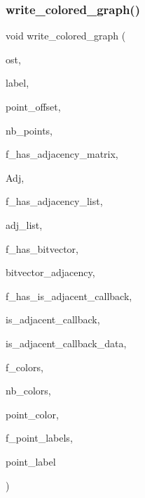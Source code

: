 \subsubsection{\texorpdfstring{write\+\_\+colored\+\_\+graph()}{write\_colored\_graph()}}
{\footnotesize\ttfamily void write\+\_\+colored\+\_\+graph (\begin{DoxyParamCaption}\item[{ofstream \&}]{ost,  }\item[{\mbox{\hyperlink{galois_8h_ab6cc7b4aeb6ea31aba2b3fbfc83ff5e6}{B\+Y\+TE}} $\ast$}]{label,  }\item[{\mbox{\hyperlink{galois_8h_a09fddde158a3a20bd2dcadb609de11dc}{I\+NT}}}]{point\+\_\+offset,  }\item[{\mbox{\hyperlink{galois_8h_a09fddde158a3a20bd2dcadb609de11dc}{I\+NT}}}]{nb\+\_\+points,  }\item[{\mbox{\hyperlink{galois_8h_a09fddde158a3a20bd2dcadb609de11dc}{I\+NT}}}]{f\+\_\+has\+\_\+adjacency\+\_\+matrix,  }\item[{\mbox{\hyperlink{galois_8h_a09fddde158a3a20bd2dcadb609de11dc}{I\+NT}} $\ast$}]{Adj,  }\item[{\mbox{\hyperlink{galois_8h_a09fddde158a3a20bd2dcadb609de11dc}{I\+NT}}}]{f\+\_\+has\+\_\+adjacency\+\_\+list,  }\item[{\mbox{\hyperlink{galois_8h_a09fddde158a3a20bd2dcadb609de11dc}{I\+NT}} $\ast$}]{adj\+\_\+list,  }\item[{\mbox{\hyperlink{galois_8h_a09fddde158a3a20bd2dcadb609de11dc}{I\+NT}}}]{f\+\_\+has\+\_\+bitvector,  }\item[{\mbox{\hyperlink{galois_8h_a122c4acf389c050379f00341fdcd5812}{U\+B\+Y\+TE}} $\ast$}]{bitvector\+\_\+adjacency,  }\item[{\mbox{\hyperlink{galois_8h_a09fddde158a3a20bd2dcadb609de11dc}{I\+NT}}}]{f\+\_\+has\+\_\+is\+\_\+adjacent\+\_\+callback,  }\item[{\mbox{\hyperlink{galois_8h_a09fddde158a3a20bd2dcadb609de11dc}{I\+NT}}($\ast$)(\mbox{\hyperlink{galois_8h_a09fddde158a3a20bd2dcadb609de11dc}{I\+NT}} \mbox{\hyperlink{alphabet2_8_c_acb559820d9ca11295b4500f179ef6392}{i}}, \mbox{\hyperlink{galois_8h_a09fddde158a3a20bd2dcadb609de11dc}{I\+NT}} \mbox{\hyperlink{alphabet2_8_c_a37d972ae0b47b9099e30983131d31916}{j}}, void $\ast$data)}]{is\+\_\+adjacent\+\_\+callback,  }\item[{void $\ast$}]{is\+\_\+adjacent\+\_\+callback\+\_\+data,  }\item[{\mbox{\hyperlink{galois_8h_a09fddde158a3a20bd2dcadb609de11dc}{I\+NT}}}]{f\+\_\+colors,  }\item[{\mbox{\hyperlink{galois_8h_a09fddde158a3a20bd2dcadb609de11dc}{I\+NT}}}]{nb\+\_\+colors,  }\item[{\mbox{\hyperlink{galois_8h_a09fddde158a3a20bd2dcadb609de11dc}{I\+NT}} $\ast$}]{point\+\_\+color,  }\item[{\mbox{\hyperlink{galois_8h_a09fddde158a3a20bd2dcadb609de11dc}{I\+NT}}}]{f\+\_\+point\+\_\+labels,  }\item[{\mbox{\hyperlink{galois_8h_a09fddde158a3a20bd2dcadb609de11dc}{I\+NT}} $\ast$}]{point\+\_\+label }\end{DoxyParamCaption})}

